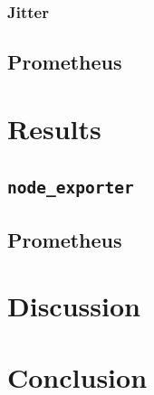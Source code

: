 \subsubsection{Jitter}
\subsection{Prometheus}



\section{Results}
\subsection{\texttt{node\_exporter}}
\subsection{Prometheus}

\section{Discussion}

\section{Conclusion}
